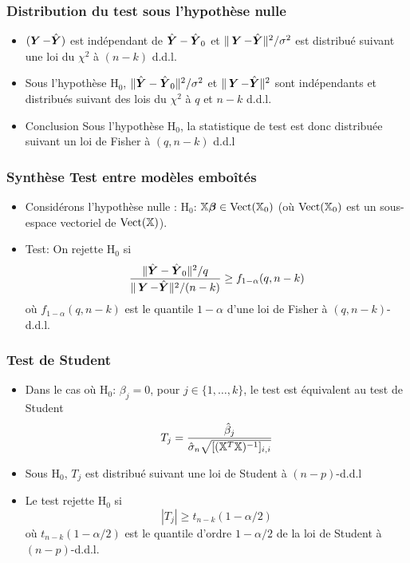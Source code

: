 \begin{frame}
\frametitle{Distribution du test sous l'hypothèse nulle}
\begin{itemize}
\item $(\operatorname{\boldsymbol{Y}} - \hat{\boldsymbol{Y}})$ est indépendant de $\hat{\boldsymbol{Y}} - \hat{\boldsymbol{Y}}_0$ et $\| \operatorname{\boldsymbol{Y}} - \hat{\boldsymbol{Y}} \|^2/ \sigma^2$ est distribué suivant une loi du $\chi^2$ à $(n-k)$ d.d.l.
\item Sous l'hypothèse $\mathrm{H}_0$, $\| \hat{\boldsymbol{Y}} - \hat{\boldsymbol{Y}}_0 \|^2/\sigma^2$ et $\| \operatorname{\boldsymbol{Y}} - \hat{\boldsymbol{Y}} \|^2$ sont \alert{indépendants} et distribués suivant des lois du $\chi^2$ à \alert{$q$} et \alert{$n-k$} d.d.l.
\item \alert{Conclusion}  Sous l'hypothèse $\mathrm{H}_0$, la statistique de test est donc distribuée suivant \alert{un loi de Fisher} à $(q,n-k)$ d.d.l
\end{itemize}
\end{frame}

\begin{frame}
\frametitle{Synthèse Test entre mod\`{e}les emboît\'{e}s}
\begin{itemize}
\item Considérons l'hypothèse  nulle : $\mathrm{H}_0$: $\mathbb{X} \boldsymbol{\beta} \in \mathrm{Vect}(\mathbb{X}_0)$ (où $\mathrm{Vect}(\mathbb{X}_0)$ est un sous-espace vectoriel de $\mathrm{Vect}(\mathbb{X})$).
\item \alert{Test:} On rejette $\mathrm{H}_0$ si
\alert{
\[
\frac{\|\hat{\boldsymbol{Y}} - \hat{\boldsymbol{Y}}_0\|^2/q}{\|\operatorname{\boldsymbol{Y}} - \hat{\boldsymbol{Y}}\|^2/(n-k)} \geq f_{1-\alpha}(q,n-k)
\]
}
où $f_{1-\alpha}(q,n-k)$ est le quantile $1-\alpha$ d'une loi de Fisher à $(q,n-k)$-d.d.l.
\end{itemize}
\end{frame}

\begin{frame}
\frametitle{Test de Student}
\begin{itemize}
  \item Dans le cas où $\mathrm{H}_0$: $\beta_j=0$, pour $j \in \{1,\dots,k\}$, le test est équivalent au test de Student
  \alert{
  \[
  T_j = \frac{\hat{\beta}_j}{\hat{\sigma}_n\sqrt{[(\mathbb{X}^T\mathbb{X})^{-1}]_{i,i}}}
  \]
  }
  \item Sous $\mathrm{H}_0$, $T_j$ est distribué suivant une loi de Student à $(n-p)$-d.d.l
  \item Le test rejette $\mathrm{H}_0$ si
  \[
  |T_j| \geq t_{n-k}(1-\alpha/2)
  \]
  où $t_{n-k}(1-\alpha/2)$ est le quantile d'ordre $1-\alpha/2$ de la loi de Student à $(n-p)$-d.d.l.
\end{itemize}
\end{frame}


